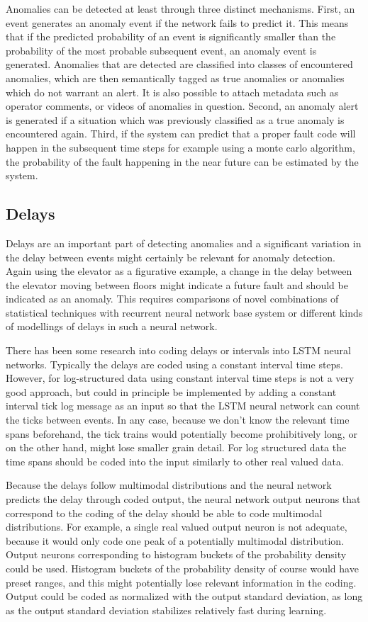 \documentclass[a4paper,10pt]{article}
\begin{document}
Anomalies can be detected at least through three distinct mechanisms. First, an event generates an anomaly event if the network fails to predict it. This means that
if the predicted probability of an event is significantly smaller than the probability of the most probable subsequent event, an anomaly event is generated.
Anomalies that are detected are classified into classes of encountered anomalies, which are then semantically tagged as true anomalies or anomalies which do not warrant an alert.
It is also possible to attach metadata such as operator comments, or videos of anomalies in question. Second, an anomaly alert is generated if a situation
which was previously classified as a true anomaly is encountered again. Third, if the system can predict that a proper fault code will happen in the subsequent
time steps for example using a monte carlo algorithm, the probability of the fault happening in the near future can be estimated by the system.

\subsection{Delays}

Delays are an important part of detecting anomalies and a significant variation in the delay between events might certainly be relevant for anomaly detection.
Again using the elevator as a figurative example, a change in the delay between the elevator moving between floors might indicate a future fault and should be indicated
as an anomaly. This requires comparisons of novel combinations of statistical techniques with recurrent neural network base system or different kinds of
modellings of delays in such a neural network.

There has been some research into coding delays or intervals into LSTM neural networks. Typically the delays are coded using a constant interval
time steps\cite{gers2003learning}. However, for log-structured data using constant interval time steps is not a very good approach, but could in principle be implemented
by adding a constant interval tick log message as an input so that the LSTM neural network can count the ticks between events. In any case, because we don't know the relevant
time spans beforehand, the tick trains would potentially become prohibitively long, or on the other hand, might lose smaller grain detail. For log structured data
the time spans should be coded into the input similarly to other real valued data.

Because the delays follow multimodal distributions and the neural network predicts the delay through coded output, the neural network output neurons that correspond to
the coding of the delay should be able to code multimodal distributions. For example, a single real valued output neuron is not adequate, because it would only code
one peak of a potentially multimodal distribution. Output neurons corresponding to histogram buckets of the probability density could be used. Histogram buckets of
the probability density of course would have preset ranges, and this might potentially lose relevant information in the coding. Output could be coded as normalized with
the output standard deviation, as long as the output standard deviation stabilizes relatively fast during learning.
\end{document}
